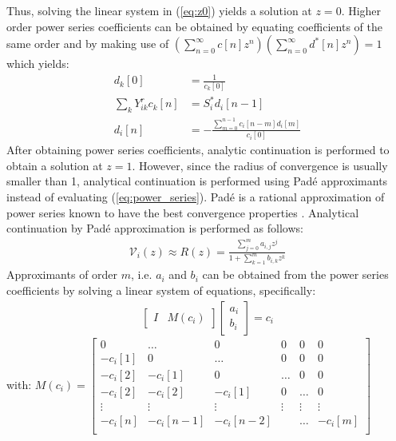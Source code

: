 Thus, solving the linear system in (\ref{eq:z0}) yields a solution at $z=0$. Higher order power series coefficients can be obtained by equating coefficients of the same order and by making use of $(\sum_{n=0}^\infty c[n]z^n)  (\sum_{n=0}^\infty d^*[n]z^n) = 1$ which yields:
\begin{align}
d_k[0]  &= \frac{1}{c_k[0]} \label{eq:d0}\\
\sum_k Y^r_{ik} c_k[n]  &= S_i^*d_i[n-1] \label{eq:fi}\\
d_i[n] &= - \frac{\sum_{m=0}^{n-1} c_i[n-m]d_i[m]}{c_i[0]} \label{eq:di}
\end{align}
After obtaining power series coefficients, analytic continuation is performed to obtain a solution at $z=1$. However, since the radius of convergence is usually smaller than 1, analytical continuation is performed using Pad\'e approximants instead of evaluating (\ref{eq:power_series}). Pad\'e is a rational approximation of power series known to have the best convergence properties \cite{stahl1989convergence}. Analytical continuation by Pad\'e approximation is performed as follows: 
\begin{align}
\mathcal{V}_i(z) \approx R(z)={\frac  {\sum _{{j=0}}^{{m}}a_{i,j}z^{j}}{1+\sum _{{k=1}}^{{m}}b_{i,k}z^{k}}} \label{eq:pade_approx}
\end{align}
Approximants of order $m$, i.e. $a_i$ and $b_i$ can be obtained from the power series coefficients by solving a linear system of equations, specifically:
\begin{align*}
\begin{bmatrix}I & M(c_i)\end{bmatrix} \begin{bmatrix}a_i\\ b_i\end{bmatrix} = c_i
\end{align*}
with: $ M(c_i) = 
\begin{bmatrix}0 & \hdots  & 0& 0 & 0& 0\\
 -c_i[1] & 0 & \hdots  & 0&  0& 0\\
 -c_i[2]& -c_i[1] & 0  &  \hdots  & 0& 0\\
 -c_i[2]& -c_i[2] & -c_i[1] & 0 & \hdots & 0\\
 \vdots & \vdots & \vdots & \vdots & \vdots & \vdots  \\
  -c_i[n]& -c_i[n-1] & -c_i[n-2] &  & \hdots & -c_i[m]\\
 \end{bmatrix}$ \\ 
 
